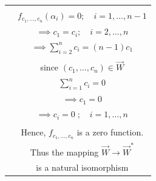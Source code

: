 \documentclass[journal,12pt,twocolumn]{IEEEtran}
\begin{document}
\begin{table}[ht]
\begin{center}
\begin{tabular}{|c|c|}
& \\
& $f_{c_1,\hdots,c_n}(\alpha_i) = 0; \quad i = 1,\hdots,n-1$ \\
& $\implies c_1 = c_i; \quad i = 2,\hdots,n$ \\
& $\implies \sum_{i=2}^n c_i = (n-1)c_1$ \\
& \\
& since $(c_1,\hdots,c_n) \in \vec{W}$ \\
& $\sum_{i=1}^n c_i = 0$ \\
& $\implies c_1 = 0$ \\
& $\implies c_i = 0 \; ; \quad i = 1,\hdots,n$ \\
& \\
& Hence, $f_{c_1,\hdots,c_n}$ is a zero function. \\
& Thus the mapping $\vec{W} \xrightarrow{} \vec{W}^*$ \\
& is a natural isomorphism \\
\hline
\end{tabular}
\end{center}
\end{table}
\end{document}
